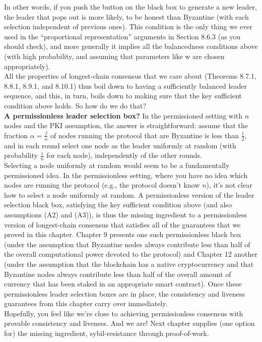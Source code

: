 In other words, if you push the button on the black box to generate a new leader, the leader
that pops out is more likely, to be honest than Byzantine (with each selection independent of previous ones). This condition is the only thing we ever used in the “proportional representation” arguments in Section 8.6.3 (as you should check), and more generally it implies
all the balancedness conditions above (with high probability, and assuming that parameters
like w are chosen appropriately).\\
All the properties of longest-chain consensus that we care about (Theorems 8.7.1, 8.8.1, 8.9.1,
and 8.10.1) thus boil down to having a sufficiently balanced leader sequence, and this, in turn,
boils down to making sure that the key sufficient condition above holds. So how do we do
that?\\

\noindent
\textbf{A permissionless leader selection box?} In the permissioned setting with $n$ nodes and
the PKI assumption, the answer is straightforward: assume that the fraction $\alpha = \frac{f}{n}$ of nodes
running the protocol that are Byzantine is less than $\frac{1}{2}$, and in each round select one node
as the leader uniformly at random (with probability $\frac{1}{n}$ for each node), independently of the
other rounds.\\
Selecting a node uniformly at random would seem to be a fundamentally permissioned
idea. In the permissionless setting, where you have no idea which nodes are running the
protocol (e.g., the protocol doesn't know $n$), it’s not clear how to select a node uniformly at
random. A permissionless version of the leader selection black box, satisfying the key sufficient condition above (and also assumptions (A2) and (A3)), is thus the missing ingredient
to a permissionless version of longest-chain consensus that satisfies all of the guarantees that
we proved in this chapter. Chapter 9 presents one such permissionless black box (under the
assumption that Byzantine nodes always contribute less than half of the overall computational power devoted to the protocol) and Chapter 12 another (under the assumption that
the blockchain has a native cryptocurrency and that Byzantine nodes always contribute less
than half of the overall amount of currency that has been staked in an appropriate smart
contract). Once these permissionless leader selection boxes are in place, the consistency and
liveness guarantees from this chapter carry over immediately.\\
Hopefully, you feel like we’re close to achieving permissionless consensus with provable
consistency and liveness. And we are! Next chapter supplies (one option for) the missing
ingredient, sybil-resistance through proof-of-work.

